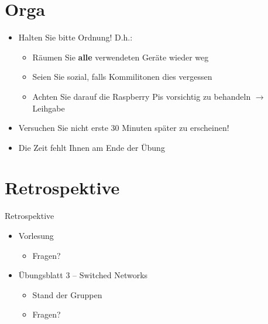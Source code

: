\documentclass[xcolor=dvipsnames]{beamer}
\begin{document}
\section{Orga}
\begin{frame}
	\begin{itemize}
		\item Halten Sie bitte Ordnung! D.h.:
		\begin{itemize}
			\item Räumen Sie \textbf{alle} verwendeten Geräte wieder weg
			\item Seien Sie sozial, falls Kommilitonen dies vergessen
			\item Achten Sie darauf die Raspberry Pis vorsichtig zu behandeln $\rightarrow$ Leihgabe
		\end{itemize}
		\item Versuchen Sie nicht erste 30 Minuten später zu erscheinen! 
		\item Die Zeit fehlt Ihnen am Ende der Übung
	\end{itemize}
\end{frame}

\section{Retrospektive}
\begin{frame}{Retrospektive}
\begin{itemize}
	\item Vorlesung
	\begin{itemize}
		\item Fragen?
	\end{itemize}
	\item Übungsblatt 3 -- Switched Networks
	\begin{itemize}
		\item Stand der Gruppen
		\item Fragen?
	\end{itemize}
\end{itemize}
\end{frame}
\end{document}
